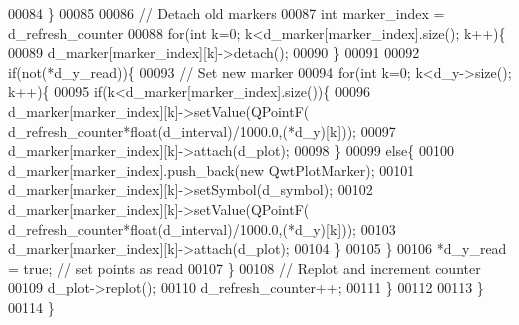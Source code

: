 \begin{DoxyCode}
00084             \}
00085             
00086             \textcolor{comment}{// Detach old markers}
00087             \textcolor{keywordtype}{int} marker\_index = d_refresh_counter%
00088             \textcolor{keywordflow}{for}(\textcolor{keywordtype}{int} k=0; k<d_marker[marker\_index].size(); k++)\{
00089                 d_marker[marker\_index][k]->detach();
00090             \}
00091             
00092             \textcolor{keywordflow}{if}(not(*d_y_read))\{
00093                 \textcolor{comment}{// Set new marker}
00094                 \textcolor{keywordflow}{for}(\textcolor{keywordtype}{int} k=0; k<d_y->size(); k++)\{
00095                     \textcolor{keywordflow}{if}(k<d_marker[marker\_index].size())\{
00096                         d_marker[marker\_index][k]->setValue(QPointF(
      d_refresh_counter*\textcolor{keywordtype}{float}(d_interval)/1000.0,(*d_y)[k]));
00097                         d_marker[marker\_index][k]->attach(d_plot);
00098                     \}
00099                     \textcolor{keywordflow}{else}\{
00100                         d_marker[marker\_index].push\_back(\textcolor{keyword}{new} QwtPlotMarker);
00101                         d_marker[marker\_index][k]->setSymbol(d_symbol);
00102                         d_marker[marker\_index][k]->setValue(QPointF(
      d_refresh_counter*\textcolor{keywordtype}{float}(d_interval)/1000.0,(*d_y)[k]));
00103                         d_marker[marker\_index][k]->attach(d_plot);
00104                     \}
00105                 \}
00106                 *d_y_read = \textcolor{keyword}{true}; \textcolor{comment}{// set points as read}
00107             \}
00108             \textcolor{comment}{// Replot and increment counter}
00109             d_plot->replot();
00110             d_refresh_counter++;
00111         \}
00112 
00113     \}
00114 \}
\end{DoxyCode}
